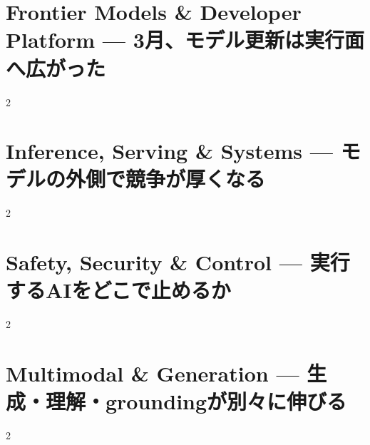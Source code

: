 \documentclass[lualatex,a4paper,11pt]{jlreq}
\begin{document}
\surveycover
\clearpage


\clearpage
\section{Frontier Models \& Developer Platform — 3月、モデル更新は実行面へ広がった}
\label{pkg:frontier-models-platform-march}
\vspace{0.15em}
\begin{multicols}{2}

\end{multicols}

\medskip


\Needspace{0.45\textheight}
\bigskip
\section{Inference, Serving \& Systems — モデルの外側で競争が厚くなる}
\label{pkg:inference-serving-systems-march}
\vspace{0.15em}
\begin{multicols}{2}

\end{multicols}

\medskip


\Needspace{0.45\textheight}
\bigskip
\section{Safety, Security \& Control — 実行するAIをどこで止めるか}
\label{pkg:safety-security-control-march}
\vspace{0.15em}
\begin{multicols}{2}

\end{multicols}

\medskip


\Needspace{0.45\textheight}
\bigskip
\section{Multimodal \& Generation — 生成・理解・groundingが別々に伸びる}
\label{pkg:multimodal-generation-march}
\vspace{0.15em}
\begin{multicols}{2}

\end{multicols}

\medskip

\end{document}
